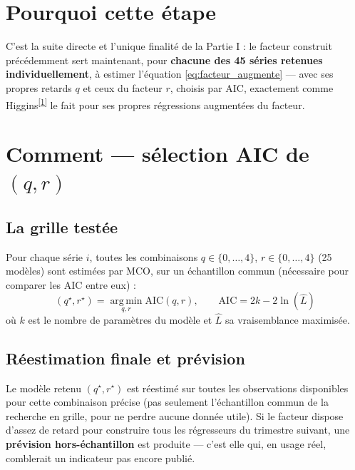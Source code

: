 \documentclass[11pt,a4paper]{article}
\newcommand{\cit}[1]{\textsuperscript{\hyperlink{ref#1}{[#1]}}}
\begin{document}
\section{Pourquoi cette étape}

\begin{intuition}
C'est la suite directe et l'unique finalité de la Partie I : le facteur construit précédemment sert maintenant, pour \textbf{chacune des 45 séries retenues individuellement}, à estimer l'équation \ref{eq:facteur_augmente} --- avec ses propres retards $q$ et ceux du facteur $r$, choisis par AIC, exactement comme Higgins\cit{1} le fait pour ses propres régressions augmentées du facteur.
\end{intuition}

\section{Comment --- sélection AIC de $(q,r)$}

\subsection{La grille testée}

Pour chaque série $i$, toutes les combinaisons $q\in\{0,\dots,4\}$, $r\in\{0,\dots,4\}$ (25 modèles) sont estimées par MCO, sur un échantillon commun (nécessaire pour comparer les AIC entre eux) :
\begin{equation}
(q^\star, r^\star) = \operatorname*{arg\,min}_{q,r} \text{AIC}(q,r), \qquad \text{AIC} = 2k - 2\ln(\hat{L})
\label{eq:aic}
\end{equation}
où $k$ est le nombre de paramètres du modèle et $\hat{L}$ sa vraisemblance maximisée.

\subsection{Réestimation finale et prévision}

Le modèle retenu $(q^\star,r^\star)$ est réestimé sur toutes les observations disponibles pour cette combinaison précise (pas seulement l'échantillon commun de la recherche en grille, pour ne perdre aucune donnée utile). Si le facteur dispose d'assez de retard pour construire tous les régresseurs du trimestre suivant, une \textbf{prévision hors-échantillon} est produite --- c'est elle qui, en usage réel, comblerait un indicateur pas encore publié.
\end{document}
